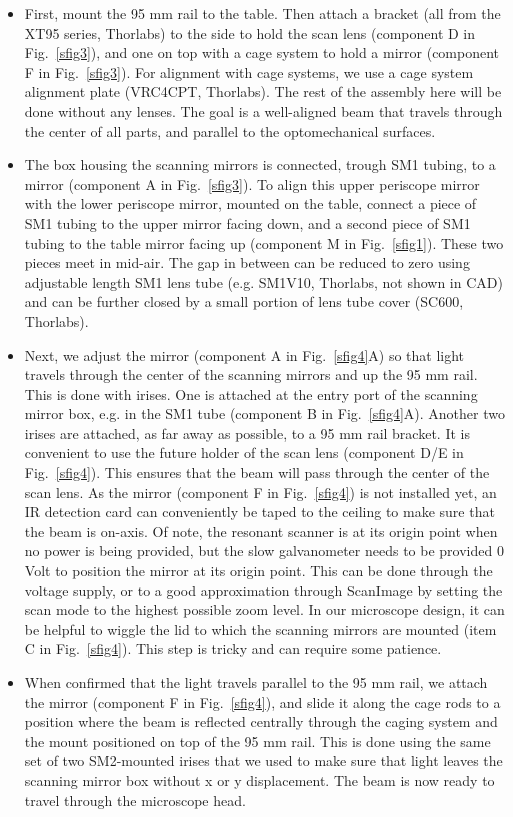 \documentclass[10pt,letterpaper]{article}
\begin{document}
\begin{itemize}
    \item First, mount the 95 mm rail to the table. Then attach a bracket (all from the XT95 series, Thorlabs) to the side to hold the scan lens (component D in Fig.~\ref{sfig3}), and one on top with a cage system to hold a mirror (component F in Fig.~\ref{sfig3}). For alignment with cage systems, we use a cage system alignment plate (VRC4CPT, Thorlabs). The rest of the assembly here will be done without any lenses. The goal is a well-aligned beam that travels through the center of all parts, and parallel to the optomechanical surfaces.
    \item The box housing the scanning mirrors is connected, trough SM1 tubing, to a mirror (component A in Fig.~\ref{sfig3}). To align this upper periscope mirror with the lower periscope mirror, mounted on the table, connect a piece of SM1 tubing to the upper mirror facing down, and  a second piece of SM1 tubing to the table mirror facing up (component M in Fig.~\ref{sfig1}). These two pieces meet in mid-air. The gap in between can be reduced to zero using adjustable length SM1 lens tube (e.g. SM1V10, Thorlabs, not shown in CAD) and can be further closed by a small portion of  lens tube cover (SC600, Thorlabs). 
    \item Next, we adjust the mirror (component A in Fig.~\ref{sfig4}A) so that light travels through the center of the scanning mirrors and up the 95 mm rail. This is done with irises. One is attached at the entry port of the scanning mirror box, e.g. in the SM1 tube (component B in Fig.~\ref{sfig4}A). Another two irises are attached, as far away as possible, to a 95 mm rail bracket. It is convenient to use the future holder of the scan lens (component D/E in Fig.~\ref{sfig4}). This ensures that the beam will pass through the center of the scan lens. As the mirror (component F in Fig.~\ref{sfig4}) is not installed yet, an IR detection card can conveniently be taped to the ceiling to make sure that the beam is on-axis. Of note, the resonant scanner is at its origin point when no power is being provided, but the slow galvanometer needs to be provided 0 Volt to position the mirror at its origin point. This can be done through the voltage supply, or to a good approximation through ScanImage by setting the scan mode to the highest possible zoom level. In our microscope design, it can be helpful to wiggle the lid to which the scanning mirrors are mounted (item C in Fig.~\ref{sfig4}). This step is tricky and can require some patience. 
    \item When confirmed that the light travels parallel to the 95 mm rail, we attach the mirror (component F in Fig.~\ref{sfig4}), and slide it along the cage rods to a position where the beam is reflected centrally through the caging system and the mount positioned on top of the 95 mm rail. This is done using the same set of two SM2-mounted irises that we used to make sure that light leaves the scanning mirror box without x or y displacement. The beam is now ready to travel through the microscope head.
\end{itemize}
\end{document}
